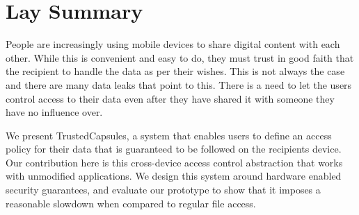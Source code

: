 

\chapter{Lay Summary}

People are increasingly using mobile devices to share digital content with each other. While this is convenient and easy to do, they must trust in good faith that the recipient to handle the data as per their wishes. This is not always the case and there are many data leaks that point to this. There is a need to let the users control access to their data even after they have shared it with someone they have no influence over.

We present TrustedCapsules, a system that enables users to define an access policy for their data that is guaranteed to be followed on the recipients device. Our contribution here is this cross-device access control abstraction that works with unmodified applications. We design this system around hardware enabled security guarantees, and evaluate our prototype to show that it imposes a reasonable slowdown when compared to regular file access.